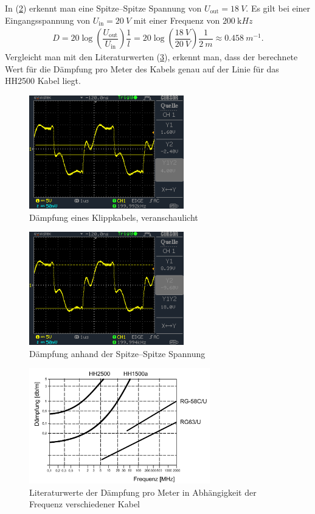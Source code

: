 \documentclass[a4paper,10pt]{article}
\numberwithin{equation}{section}
\begin{document}
In (\ref{fig:dämpfung}) erkennt man eine Spitze--Spitze Spannung von $U_\text{out}=\SI{18}{V}$.
Es gilt bei einer Eingangsspannung von $U_\text{in}=\SI{20}{V}$ mit einer Frequenz von $\SI{200}{\kilo Hz}$
\begin{align} 
        D=20\log\left(\dfrac{U_\text{out}}{U_\text{in}}\right)\dfrac{1}{l}=20\log\left(\dfrac{\SI{18}{V}}{\SI{20}{V}}\right)\dfrac{1}{\SI{2}{m}}\approx \SI{0.458}{m ^{-1}}
.\end{align} 
Vergleicht man mit den Literaturwerten (\ref{fig:literatur}), erkennt man, dass der berechnete Wert für die Dämpfung pro Meter des Kabels genau auf der Linie für das HH2500 Kabel liegt.
\begin{figure}[h]
        \centering
        \includegraphics[width=0.6\textwidth]{data/DS0038.BMP.png}
        \caption{Dämpfung eines Klippkabels, veranschaulicht}\label{fig:dämpfung_anschaulich}
\end{figure}
\begin{figure}
        \centering
        \includegraphics[width=0.6\textwidth]{data/DS0039.BMP.png}
        \caption{Dämpfung anhand der Spitze--Spitze Spannung}\label{fig:dämpfung}
\end{figure}
\begin{figure}[h]
        \centering
        \includegraphics[width=0.7\textwidth]{literatur.png}
        \caption[Literatur Dämpfung pro Meter]{Literaturwerte der Dämpfung pro Meter in Abhängigkeit der Frequenz verschiedener Kabel}\label{fig:literatur}
\end{figure}
\end{document}
